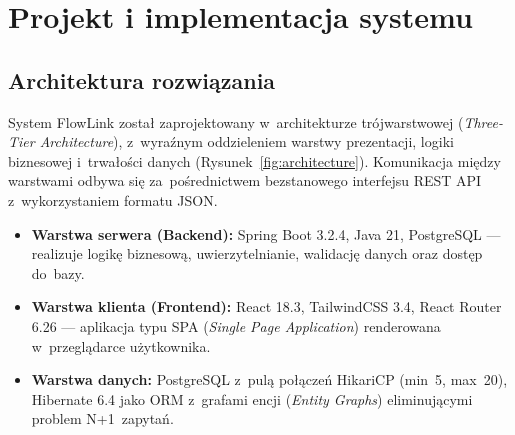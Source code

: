 \chapter{Projekt i implementacja systemu}

\section{Architektura rozwiązania}

System FlowLink został zaprojektowany w~architekturze trójwarstwowej (\textit{Three-Tier Architecture}), z~wyraźnym oddzieleniem warstwy prezentacji, logiki biznesowej i~trwałości danych (Rysunek~\ref{fig:architecture}). Komunikacja między warstwami odbywa się za~pośrednictwem bezstanowego interfejsu REST API z~wykorzystaniem formatu JSON.

\begin{itemize}
    \item \textbf{Warstwa serwera (Backend):} Spring Boot 3.2.4, Java 21, PostgreSQL --- realizuje logikę biznesową, uwierzytelnianie, walidację danych oraz dostęp do~bazy.
    \item \textbf{Warstwa klienta (Frontend):} React 18.3, TailwindCSS 3.4, React Router 6.26 --- aplikacja typu SPA (\textit{Single Page Application}) renderowana w~przeglądarce użytkownika.
    \item \textbf{Warstwa danych:} PostgreSQL z~pulą połączeń HikariCP (min~5, max~20), Hibernate 6.4 jako ORM z~grafami encji (\textit{Entity Graphs}) eliminującymi problem N+1~zapytań.
\end{itemize}

